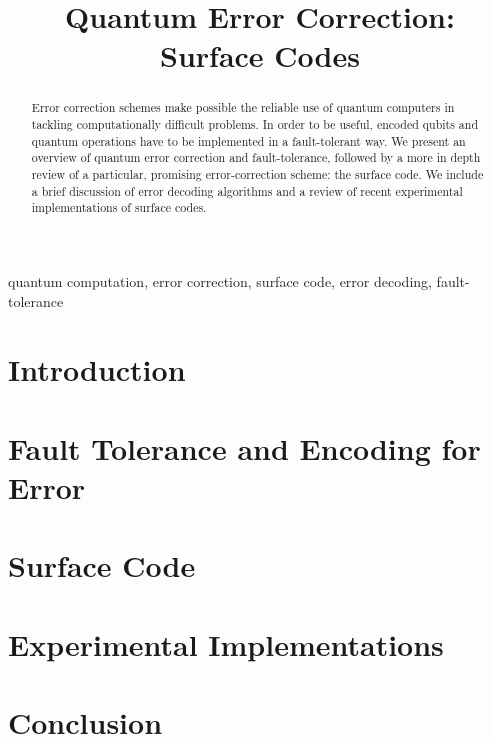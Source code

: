 \documentclass[conference]{IEEEtran}
\begin{document}
\title{Quantum Error Correction: Surface Codes}

\author{

  \and

}

\maketitle


\begin{abstract}
Error correction schemes make possible the reliable use of quantum computers in
tackling computationally difficult problems. In order to be useful, encoded
qubits and quantum operations have to be implemented in a fault-tolerant way. We
present an overview of quantum error correction and fault-tolerance, followed by
a more in depth review of a particular, promising error-correction scheme: the
surface code. We include a brief discussion of error decoding algorithms and a
review of recent experimental implementations of surface codes.
\end{abstract}

\begin{IEEEkeywords}
  quantum computation, error correction, surface code, error decoding, fault-tolerance
\end{IEEEkeywords}

\section{Introduction}


\section{Fault Tolerance and Encoding for Error}


\section{Surface Code}


\section{Experimental Implementations}


\section{Conclusion}


\pagebreak
\printbibliography
\end{document}
